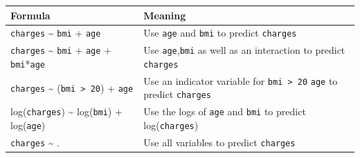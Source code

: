 \documentclass[]{book}
\begin{document}
\begin{longtable}[]{@{}ll@{}}
\toprule
\begin{minipage}[b]{0.41\columnwidth}\raggedright
Formula\strut
\end{minipage} & \begin{minipage}[b]{0.53\columnwidth}\raggedright
Meaning\strut
\end{minipage}\tabularnewline
\midrule
\endhead
\begin{minipage}[t]{0.41\columnwidth}\raggedright
\texttt{charges} \textasciitilde{} \texttt{bmi} + \texttt{age}\strut
\end{minipage} & \begin{minipage}[t]{0.53\columnwidth}\raggedright
Use \texttt{age} and \texttt{bmi} to predict \texttt{charges}\strut
\end{minipage}\tabularnewline
\begin{minipage}[t]{0.41\columnwidth}\raggedright
\texttt{charges} \textasciitilde{} \texttt{bmi} + \texttt{age} + \texttt{bmi}*\texttt{age}\strut
\end{minipage} & \begin{minipage}[t]{0.53\columnwidth}\raggedright
Use \texttt{age},\texttt{bmi} as well as an interaction to predict \texttt{charges}\strut
\end{minipage}\tabularnewline
\begin{minipage}[t]{0.41\columnwidth}\raggedright
\texttt{charges} \textasciitilde{} (\texttt{bmi\ \textgreater{}\ 20}) + \texttt{age}\strut
\end{minipage} & \begin{minipage}[t]{0.53\columnwidth}\raggedright
Use an indicator variable for \texttt{bmi\ \textgreater{}\ 20} \texttt{age} to predict \texttt{charges}\strut
\end{minipage}\tabularnewline
\begin{minipage}[t]{0.41\columnwidth}\raggedright
log(\texttt{charges}) \textasciitilde{} log(\texttt{bmi}) + log(\texttt{age})\strut
\end{minipage} & \begin{minipage}[t]{0.53\columnwidth}\raggedright
Use the logs of \texttt{age} and \texttt{bmi} to predict log(\texttt{charges})\strut
\end{minipage}\tabularnewline
\begin{minipage}[t]{0.41\columnwidth}\raggedright
\texttt{charges} \textasciitilde{} .\strut
\end{minipage} & \begin{minipage}[t]{0.53\columnwidth}\raggedright
Use all variables to predict \texttt{charges}\strut
\end{minipage}\tabularnewline
\bottomrule
\end{longtable}
\end{document}

